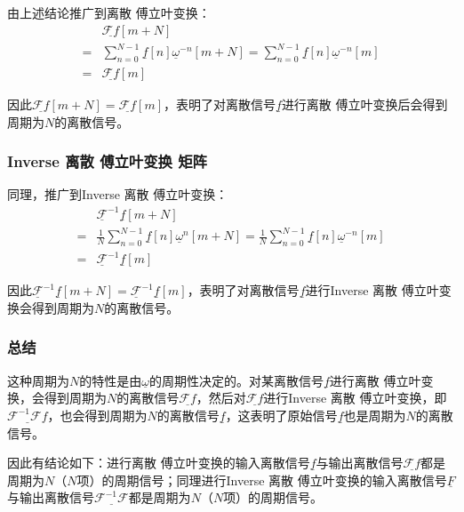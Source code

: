 由上述结论推广到离散 傅立叶变换：
\begin{align*}
	  & \underline{\mathcal{F}f}[m+N]                                \\
	= & \sum_{n=0}^{N-1}\underline{f}[n]\underline{\omega}^{-n}[m+N]
	= \sum_{n=0}^{N-1}\underline{f}[n]\underline{\omega}^{-n}[m]     \\
	= & \underline{\mathcal{F}f}[m]
\end{align*}

因此$\underline{\mathcal{F}f}[m+N] = \underline{\mathcal{F}f}[m]$，表明了对离散信号$\underline{f}$进行离散 傅立叶变换后会得到周期为$N$的离散信号。

\subsubsection{Inverse 离散 傅立叶变换 矩阵}

同理，推广到Inverse 离散 傅立叶变换：
\begin{align*}
	  & \underline{\mathcal{F}}^{-1}\underline{f}[m+N]                                                                                                \\
	= & \frac{1}{N}\sum_{n=0}^{N-1}\underline{f}[n]\underline{\omega}^{n}[m+N]= \frac{1}{N}\sum_{n=0}^{N-1}\underline{f}[n]\underline{\omega}^{-n}[m] \\
	= & \underline{\mathcal{F}}^{-1}\underline{f}[m]
\end{align*}

因此$\underline{\mathcal{F}}^{-1}\underline{f}[m+N] = \underline{\mathcal{F}}^{-1}\underline{f}[m]$，表明了对离散信号$\underline{f}$进行Inverse 离散 傅立叶变换会得到周期为$N$的离散信号。
\subsubsection{总结}
这种周期为$N$的特性是由$\underline{\omega}$的周期性决定的。对某离散信号$\underline{f}$进行离散 傅立叶变换，会得到周期为$N$的离散信号$\underline{\mathcal{F}f}$，然后对$\underline{\mathcal{F}f}$进行Inverse 离散 傅立叶变换，即$\underline{\mathcal{F}^{-1}\mathcal{F}f}$，也会得到周期为$N$的离散信号$\underline{f}$，这表明了原始信号$\underline{f}$也是周期为$N$的离散信号。

因此有结论如下：进行离散 傅立叶变换的输入离散信号$\underline{f}$与输出离散信号$\underline{\mathcal{F}f}$都是周期为$N$（$N$项）的周期信号；同理进行Inverse 离散 傅立叶变换的输入离散信号$\underline{F}$与输出离散信号$\underline{\mathcal{F}^{-1}\mathcal{F}}$都是周期为$N$（$N$项）的周期信号。

